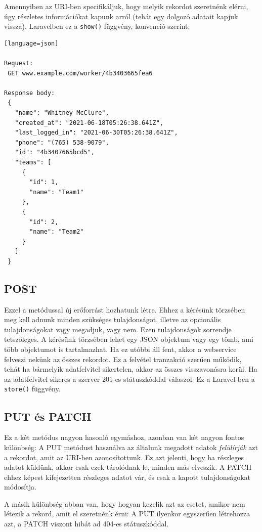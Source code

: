 \documentclass[a4paper,12pt]{thesis-ekf}
\theoremstyle{definition}
\begin{document}
				Amennyiben az URI-ben specifikáljuk, hogy melyik rekordot szeretnénk elérni, úgy részletes információkat kapunk arról (tehát egy dolgozó adatait kapjuk vissza). Laravelben ez a \verb|show()| függvény, konvenció szerint.
\begin{lstlisting}[caption={P\'elda a READ met\'odusra},captionpos=b][language=json]

Request:
 GET www.example.com/worker/4b3403665fea6
 
Response body:
 {
   "name": "Whitney McClure",
   "created_at": "2021-06-18T05:26:38.641Z",
   "last_logged_in": "2021-06-30T05:26:38.641Z",
   "phone": "(765) 538-9079",
   "id": "4b3407665bcd5",
   "teams": [
     {
       "id": 1,
       "name": "Team1"
     },
     {
       "id": 2,
       "name": "Team2"
     }
   ]
 }
\end{lstlisting}

			\subsection{POST}
				Ezzel a metódussal új erőforrást hozhatunk létre. Ehhez a kérésünk törzsében meg kell adnunk minden szükséges tulajdonságot, illetve az opcionális tulajdonságokat vagy megadjuk, vagy nem. Ezen tulajdonságok sorrendje tetszőleges. A kérésünk törzsében lehet egy JSON objektum vagy egy tömb, ami több objektumot is tartalmazhat. Ha ez utóbbi áll fent, akkor a webservice felveszi nekünk az összes rekordot. Ez a felvétel tranzakció szerűen működik, tehát ha bármelyik adatfelvitel sikertelen, akkor az összes visszavonásra kerül. Ha az adatfelvitel sikeres a szerver 201-es státuszkóddal válaszol. Ez a Laravel-ben a \verb|store()| függvény.
				
			\subsection{PUT és PATCH}
				Ez a két metódus nagyon hasonló egymáshoz, azonban van két nagyon fontos különbség: A PUT metódust használva az általunk megadott adatok \emph{felülírják} azt a rekordot, amit az URI-ben azonosítottunk. Ez azt jelenti, hogy ha részleges adatot küldünk, akkor csak ezek tárolódnak le, minden más elveszik. A PATCH ehhez képest kifejezetten részleges adatot vár, és csak a kapott tulajdonságokat módosítja. 
				
				A másik különbség abban van, hogy hogyan kezelik azt az esetet, amikor nem létezik a rekord, amit el szeretnénk érni: A PUT ilyenkor egyszerűen létrehozza azt, a PATCH viszont hibát ad 404-es státuszkóddal.
				
\end{document}
